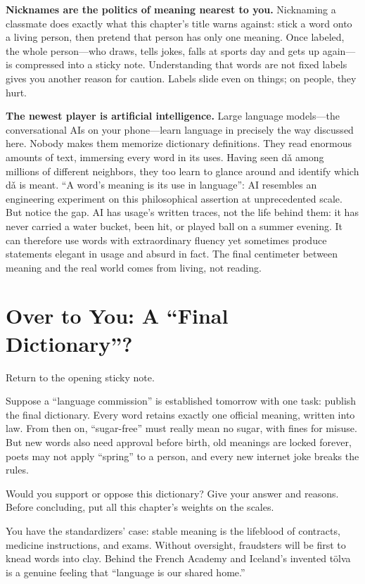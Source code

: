 \textbf{Nicknames are the politics of meaning nearest to you.} Nicknaming a classmate does exactly what this chapter's title warns against: stick a word onto a living person, then pretend that person has only one meaning. Once labeled, the whole person---who draws, tells jokes, falls at sports day and gets up again---is compressed into a sticky note. Understanding that words are not fixed labels gives you another reason for caution. Labels slide even on things; on people, they hurt.

\textbf{The newest player is artificial intelligence.} Large language models---the conversational AIs on your phone---learn language in precisely the way discussed here. Nobody makes them memorize dictionary definitions. They read enormous amounts of text, immersing every word in its uses. Having seen dǎ among millions of different neighbors, they too learn to glance around and identify which dǎ is meant. ``A word's meaning is its use in language'': AI resembles an engineering experiment on this philosophical assertion at unprecedented scale. But notice the gap. AI has usage's written traces, not the life behind them: it has never carried a water bucket, been hit, or played ball on a summer evening. It can therefore use words with extraordinary fluency yet sometimes produce statements elegant in usage and absurd in fact. The final centimeter between meaning and the real world comes from living, not reading.

\section{Over to You: A ``Final Dictionary''?}
Return to the opening sticky note.

Suppose a ``language commission'' is established tomorrow with one task: publish the final dictionary. Every word retains exactly one official meaning, written into law. From then on, ``sugar-free'' must really mean no sugar, with fines for misuse. But new words also need approval before birth, old meanings are locked forever, poets may not apply ``spring'' to a person, and every new internet joke breaks the rules.

Would you support or oppose this dictionary? Give your answer and reasons. Before concluding, put all this chapter's weights on the scales.

You have the standardizers' case: stable meaning is the lifeblood of contracts, medicine instructions, and exams. Without oversight, fraudsters will be first to knead words into clay. Behind the French Academy and Iceland's invented tölva is a genuine feeling that ``language is our shared home.''

